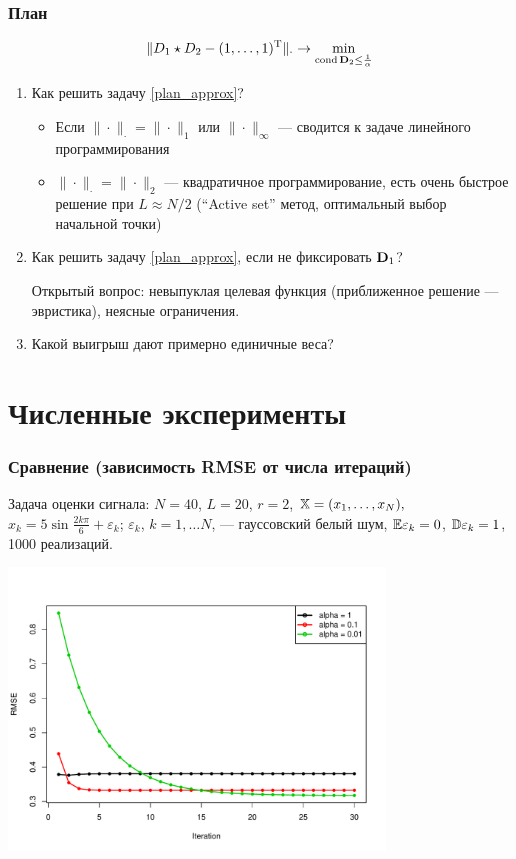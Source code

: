 \documentclass[unicode, notheorems]{beamer}
\DeclareMathOperator{\cond}{cond}
\begin{document}
\begin{frame}
	\frametitle{План}
	\begin{equation}\label{plan_approx}
	\|D_1 \star D_2 - (1, \ldots, 1)^\rmT\|_\cdot \to \min_{\cond \bfD_2 \le \frac{1}{\alpha}}
	\end{equation}
	
	\begin{enumerate}
		\item Как решить задачу \eqref{plan_approx}?
		\begin{itemize}
			\item
		Если $\|\cdot\|_\cdot = \|\cdot\|_1$ или $\|\cdot\|_\infty$ --- сводится к задаче линейного программирования
		\item
		$\|\cdot\|_\cdot = \|\cdot\|_2$ --- квадратичное программирование, есть очень быстрое решение при $L \approx N/2$ (``Active set'' метод, оптимальный выбор начальной точки)		
		\end{itemize}

		
		\pause
		\item Как решить задачу \eqref{plan_approx}, если не фиксировать $\mathbf{D}_1$?
		
		Открытый вопрос: невыпуклая целевая функция (приближенное решение --- эвристика), неясные ограничения.
		\pause
		\item Какой выигрыш дают примерно единичные веса?
	\end{enumerate}
	
\end{frame}

\section{Численные эксперименты}
\begin{frame}
	\frametitle{Сравнение (зависимость RMSE от числа итераций)}
	Задача оценки сигнала: $N = 40$, $L = 20$, $r = 2$, $\mathbb{X} = (x_{1}, \ldots, x_N),$  $x_k = 5\sin{\frac{2 k \pi}{6}} + \varepsilon_k$; $\varepsilon_k$, $k = 1, \ldots N$, --- гауссовский белый шум, $\mathbb{E} \varepsilon_k = 0$, $\mathbb{D} \varepsilon_k = 1$, 1000 реализаций.
	
	\vspace{-1cm}
	\begin{center}
		\includegraphics*[width = 10cm]{threealphas.pdf}
	\end{center}
\end{frame}
\end{document}
